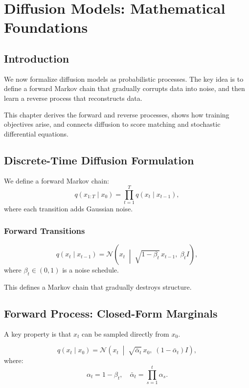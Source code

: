 \chapter{Diffusion Models: Mathematical Foundations}

\section{Introduction}

We now formalize diffusion models as probabilistic processes. The key idea is to define a forward Markov chain that gradually corrupts data into noise, and then learn a reverse process that reconstructs data.

This chapter derives the forward and reverse processes, shows how training objectives arise, and connects diffusion to score matching and stochastic differential equations.

\section{Discrete-Time Diffusion Formulation}

We define a forward Markov chain:
\[
q(x_{1:T} \mid x_0) = \prod_{t=1}^T q(x_t \mid x_{t-1}),
\]
where each transition adds Gaussian noise.

\subsection{Forward Transitions}

\begin{definition}
\[
q(x_t \mid x_{t-1})
=
\mathcal{N}\left(x_t \;\middle|\; \sqrt{1-\beta_t}\,x_{t-1}, \;\beta_t I \right),
\]
where $\beta_t \in (0,1)$ is a noise schedule.
\end{definition}

This defines a Markov chain that gradually destroys structure.

\section{Forward Process: Closed-Form Marginals}

A key property is that $x_t$ can be sampled directly from $x_0$.

\begin{proposition}
\[
q(x_t \mid x_0)
=
\mathcal{N}\left(x_t \;\middle|\; \sqrt{\bar{\alpha}_t}\,x_0, \;(1-\bar{\alpha}_t)I \right),
\]
where:
\[
\alpha_t = 1 - \beta_t,
\quad
\bar{\alpha}_t = \prod_{s=1}^t \alpha_s.
\]
\end{proposition}

